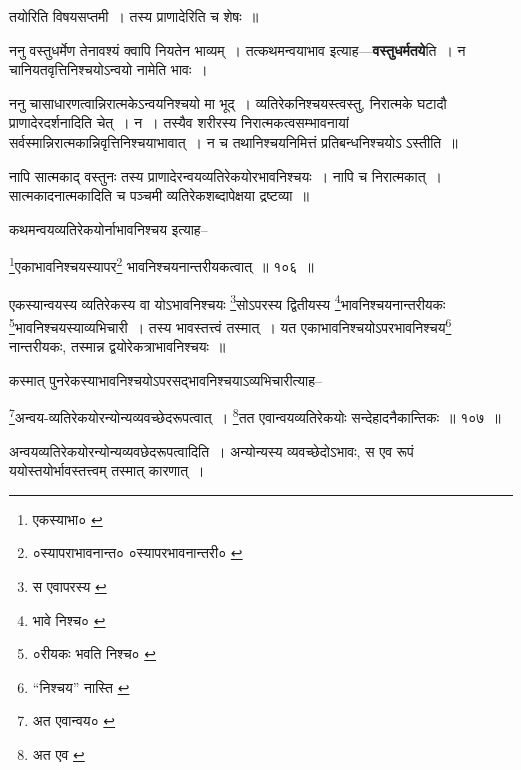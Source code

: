 \documentclass[article,12pt,a4paper]{memoir}
\begin{document}
	  \pstart तयोरिति विषयसप्तमी । तस्य प्राणादेरिति च शेषः ॥
	\pend
      

	  \pstart ननु वस्तुधर्मेण तेनावश्यं क्वापि नियतेन भाव्यम् । तत्कथमन्वयाभाव इत्याह—\textbf{वस्तुधर्मतये}ति । न चानियतवृत्तिनिश्चयोऽन्वयो नामेति भावः ।
	\pend
      

	  \pstart ननु चासाधारणत्वान्निरात्मकेऽन्वयनिश्चयो मा भूद् । व्यतिरेकनिश्चयस्त्वस्तु, निरात्मके घटादौ प्राणादेरदर्शनादिति चेत् । न । तस्यैव \leavevmode{} शरीरस्य निरात्मकत्वसम्भावनायां सर्वस्मान्निरात्मकान्निवृत्तिनिश्चयाभावात् । न च तथानिश्चयनिमित्तं प्रतिबन्धनिश्चयोऽ ऽस्तीति ॥
	\pend
      \leavevmode{}
	  \bigskip
	  \begingroup
	

	  \pstart नापि सात्मकाद् वस्तुनः तस्य प्राणादेरन्वयव्यतिरेकयोरभावनिश्चयः । नापि च निरात्मकात् । सात्मकादनात्मकादिति च पञ्चमी व्यतिरेकशब्दापेक्षया द्रष्टव्या ॥
	\pend
       

	  \pstart कथमन्वयव्यतिरेकयोर्नाभावनिश्चय इत्याह--
	\pend
       
	  \bigskip
	  \begingroup
	

	  \pstart \footnote{एकस्याभा० \cite{dp-msC}}एकाभावनिश्चयस्यापर\footnote{०स्यापराभावनान्त० \cite{dp-msB} \cite{dp-edP} \cite{dp-edH} ०स्यापरभावनान्तरी० \cite{dp-msD} \cite{dp-edE}} भावनिश्चयनान्तरीयकत्वात् ॥ १०६ ॥
	\pend
      
	  \endgroup
	 

	  \pstart एकस्यान्वयस्य व्यतिरेकस्य वा योऽभावनिश्चयः \footnote{स एवापरस्य \cite{dp-edE} \cite{dp-edN}}सोऽपरस्य द्वितीयस्य \footnote{भावे निश्च० \cite{dp-msA} \cite{dp-msB} \cite{dp-edP} \cite{dp-edH}}भावनिश्चयनान्तरीयकः \footnote{०रीयकः भवति निश्च० \cite{dp-msA} \cite{dp-msB} \cite{dp-edP} \cite{dp-edH}}भावनिश्चयस्याव्यभिचारी । तस्य भावस्तत्त्वं तस्मात् । यत एकाभावनिश्चयोऽपरभावनिश्चय\footnote{“निश्चय” नास्ति \cite{dp-msA} \cite{dp-msC}} नान्तरीयकः, तस्मान्न द्वयोरेकत्राभावनिश्चयः ॥
	\pend
       

	  \pstart कस्मात् पुनरेकस्याभावनिश्चयोऽपरसद्भावनिश्चयाऽव्यभिचारीत्याह--
	\pend
       
	  \bigskip
	  \begingroup
	

	  \pstart \footnote{अत एवान्वय० \cite{dp-msC}}अन्वय-व्यतिरेकयोरन्योन्यव्यवच्छेदरूपत्वात् । \footnote{अत एव \cite{dp-msD} \cite{dp-msB} \cite{dp-edP} \cite{dp-edH} \cite{dp-edE} \cite{dp-edN}}तत एवान्वयव्यतिरेकयोः सन्देहादनैकान्तिकः ॥ १०७ ॥
	\pend
      
	  \endgroup
	 

	  \pstart अन्वयव्यतिरेकयोरन्योन्यव्यवछेदरूपत्वादिति । अन्योन्यस्य व्यवच्छेदोऽभावः, स एव रूपं ययोस्तयोर्भावस्तत्त्वम् तस्मात् कारणात् ।
	\pend
       
\end{document}
